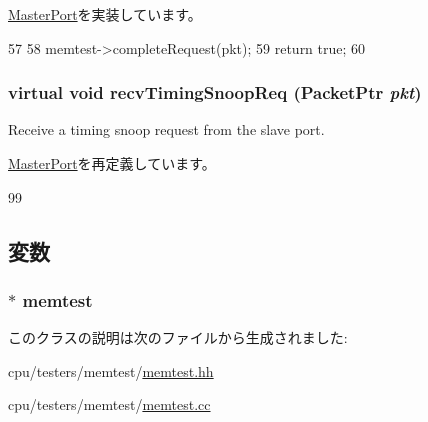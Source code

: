 \hyperlink{classMasterPort_abd323548d6c93f8b0543f1fe3a86ca35}{MasterPort}を実装しています。


\begin{DoxyCode}
57 {
58     memtest->completeRequest(pkt);
59     return true;
60 }
\end{DoxyCode}
\hypertarget{classMemTest_1_1CpuPort_ae43c73eff109f907118829fcfa9e7096}{
\subsubsection[{recvTimingSnoopReq}]{\setlength{\rightskip}{0pt plus 5cm}virtual void recvTimingSnoopReq ({\bf PacketPtr} {\em pkt})}}
\label{classMemTest_1_1CpuPort_ae43c73eff109f907118829fcfa9e7096}
Receive a timing snoop request from the slave port. 

\hyperlink{classMasterPort_ae43c73eff109f907118829fcfa9e7096}{MasterPort}を再定義しています。


\begin{DoxyCode}
99 { }
\end{DoxyCode}


\subsection{変数}
\hypertarget{classMemTest_1_1CpuPort_a63a1c6b42fdf48654db0e08d90e2bbda}{
\subsubsection[{memtest}]{$\ast$ {\bf memtest}}}
\label{classMemTest_1_1CpuPort_a63a1c6b42fdf48654db0e08d90e2bbda}


このクラスの説明は次のファイルから生成されました:\begin{DoxyCompactItemize}
\item 
cpu/testers/memtest/\hyperlink{memtest_8hh}{memtest.hh}\item 
cpu/testers/memtest/\hyperlink{memtest_8cc}{memtest.cc}\end{DoxyCompactItemize}
